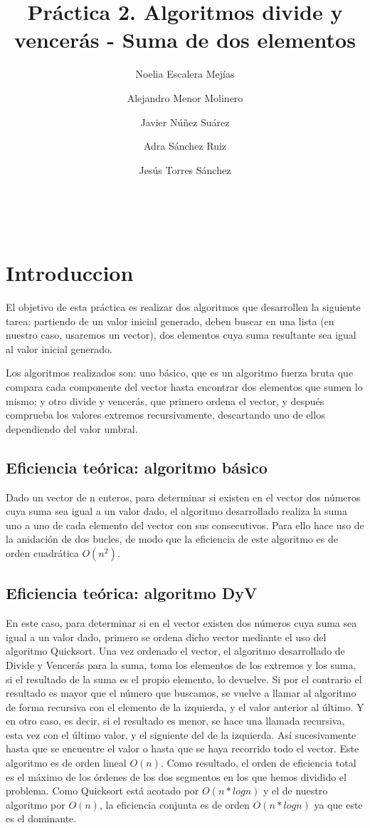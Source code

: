 \documentclass{article}
\title{Práctica 2. Algoritmos divide y vencerás - Suma de dos elementos}
\author{Noelia Escalera Mejías \\
		\and Alejandro Menor Molinero \\
		\and Javier Núñez Suárez \\
		\and Adra Sánchez Ruiz \\
		\and Jesús Torres Sánchez}
\begin{document}
	\maketitle
	\tableofcontents
	\
	\
	\section{Introduccion}
	El objetivo de esta práctica es realizar dos algoritmos que desarrollen la siguiente tarea: partiendo de un valor inicial generado, deben buscar en una lista (en nuestro caso, usaremos un vector), dos elementos cuya suma resultante sea igual al valor inicial generado. 
	
	Los algoritmos realizados son: uno básico, que es un algoritmo fuerza bruta que compara cada componente del vector hasta encontrar dos elementos que sumen lo mismo; y otro divide y vencerás, que primero ordena el vector, y después comprueba los valores extremos recursivamente, descartando uno de ellos dependiendo del valor umbral. 
	
	
	\subsection{Eficiencia teórica: algoritmo básico}
	
	 Dado un vector de n enteros, para determinar si existen en el vector dos números cuya suma sea igual a un valor dado, el algoritmo desarrollado realiza la suma uno a uno de cada
	 elemento del vector con sus consecutivos.
	 Para ello hace uso de la anidación de dos bucles, de modo que la eficiencia de este algoritmo es de orden cuadrática $O(n^2)$.
	
	
	\subsection{Eficiencia teórica: algoritmo DyV}
	
	En este caso, para determinar si en el vector existen dos números cuya suma sea igual a un valor dado, primero se ordena dicho vector mediante el uso del algoritmo Quicksort.
	Una vez ordenado el vector, el algoritmo desarrollado de Divide y Vencerás para la suma, toma los elementos de los extremos y los suma, si el resultado de la suma es el propio elemento, lo
	devuelve. Si por el contrario el resultado es mayor que el número que buscamos, se vuelve a llamar al algoritmo de forma recursiva con el elemento de la izquierda, y el valor anterior al
	último. Y en otro caso, es decir, si el resultado es menor, se hace una llamada recursiva, esta vez con el último valor, y el siguiente del de la izquierda. Así sucesivamente hasta que se
	encuentre el valor o hasta que se haya recorrido todo el vector. Este algoritmo es de orden lineal $O(n)$.
	Como resultado, el orden de eficiencia total es el máximo de los órdenes de los dos segmentos en los que hemos dividido el problema. Como Quicksort está acotado por $O(n*logn)$ y el de
	nuestro algoritmo por $O(n)$, la eficiencia conjunta es de orden $O(n*logn)$ ya que este es el
	dominante.
	
\end{document}
